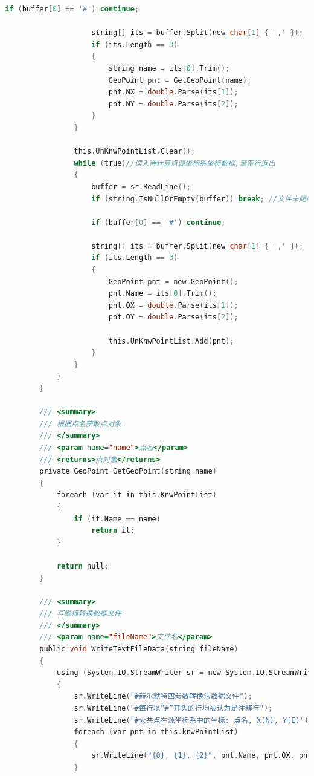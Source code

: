 \begin{lstlisting}[language=C]
                    if (buffer[0] == '#') continue;

                    string[] its = buffer.Split(new char[1] { ',' });
                    if (its.Length == 3)
                    {
                        string name = its[0].Trim();
                        GeoPoint pnt = GetGeoPoint(name);
                        pnt.NX = double.Parse(its[1]);
                        pnt.NY = double.Parse(its[2]);
                    }
                }

                this.UnKnwPointList.Clear();
                while (true)//读入待计算点源坐标系坐标数据,至空行退出
                {
                    buffer = sr.ReadLine();
                    if (string.IsNullOrEmpty(buffer)) break; //文件末尾或空行退出

                    if (buffer[0] == '#') continue;

                    string[] its = buffer.Split(new char[1] { ',' });
                    if (its.Length == 3)
                    {
                        GeoPoint pnt = new GeoPoint();
                        pnt.Name = its[0].Trim();
                        pnt.OX = double.Parse(its[1]);
                        pnt.OY = double.Parse(its[2]);

                        this.UnKnwPointList.Add(pnt);
                    }
                }
            }
        }
     
        /// <summary>
        /// 根据点名获取点对象
        /// </summary>
        /// <param name="name">点名</param>
        /// <returns>点对象</returns>
        private GeoPoint GetGeoPoint(string name)
        {
            foreach (var it in this.KnwPointList)
            {
                if (it.Name == name)
                    return it;
            }

            return null;
        }

        /// <summary>
        /// 写坐标转换数据文件
        /// </summary>
        /// <param name="fileName">文件名</param>
        public void WriteTextFileData(string fileName)
        {
            using (System.IO.StreamWriter sr = new System.IO.StreamWriter(fileName))
            {
                sr.WriteLine("#赫尔默特四参数转换法数据文件");
                sr.WriteLine("#每行以“#”开头的行均被认为是注释行");
                sr.WriteLine("#公共点在源坐标系中的坐标: 点名, X(N), Y(E)");
                foreach (var pnt in this.knwPointList)
                {
                    sr.WriteLine("{0}, {1}, {2}", pnt.Name, pnt.OX, pnt.OY);
                }


\end{lstlisting}
